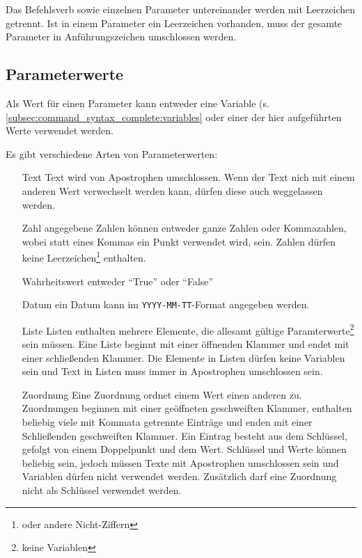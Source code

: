 Das Befehlsverb sowie einzelnen Parameter untereinander werden mit Leerzeichen getrennt. Ist in einem Parameter ein Leerzeichen vorhanden, muss der gesamte Parameter in Anführungszeichen umschlossen werden.


\subsection{Parameterwerte}
\label{subsec:command_syntax_complete:param_values}

Als Wert für einen Parameter kann entweder eine Variable (s. \ref{subsec:command_syntax_complete:variables} oder einer der hier aufgeführten Werte verwendet werden.

Es gibt verschiedene Arten von Parameterwerten:

\begin{itemize}
\item[Text]  Text wird von Apostrophen umschlossen. Wenn der Text nich mit einem anderen Wert verwechselt werden kann, dürfen diese auch weggelassen werden.
\item[Zahl] angegebene Zahlen können entweder ganze Zahlen oder Kommazahlen, wobei statt eines Kommas ein Punkt verwendet wird, sein. Zahlen dürfen keine Leerzeichen\footnote{oder andere Nicht-Ziffern} enthalten.
\item[Wahrheitswert] entweder ``True'' oder ``False''
\item[Datum] ein Datum kann im \texttt{YYYY-MM-TT}-Format angegeben werden.
\item[Liste] Listen enthalten mehrere Elemente, die allesamt gültige Paramterwerte\footnote{keine Variablen} sein müssen. Eine Liste beginnt mit einer öffnenden Klammer und endet mit einer schlie\ss enden Klammer. Die Elemente in Listen dürfen keine Variablen sein und Text in Listen muss immer in Apostrophen umschlossen sein.
\item[Zuordnung] Eine Zuordnung ordnet einem Wert einen anderen zu. Zuordnungen beginnen mit einer geöffneten geschweiften Klammer, enthalten beliebig viele mit Kommata getrennte Einträge und enden mit einer Schlie\ss enden geschweiften Klammer. Ein Eintrag besteht aus dem Schlüssel, gefolgt von einem Doppelpunkt und dem Wert. Schlüssel und Werte können beliebig sein, jedoch müssen Texte mit Apostrophen umschlossen sein und Variablen dürfen nicht verwendet werden. Zusätzlich darf eine Zuordnung nicht als Schlüssel verwendet werden.
\end{itemize}

